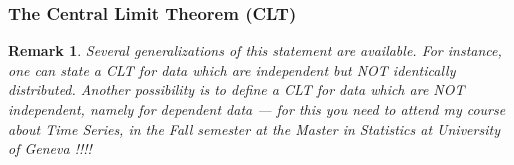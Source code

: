 \documentclass[notes=show,smaller,handout]{beamer}\usepackage[]{graphicx}\usepackage[]{color}
\newtheorem{remark}{Remark}[section]
\begin{document}
\begin{frame}%

\frametitle{The Central Limit Theorem (CLT)}

\begin{remark}
Several generalizations of this statement are available. For instance, one can state a CLT for data which are independent but NOT identically distributed. Another possibility is to define a CLT for data which are NOT independent, namely for dependent data --- for this you need to attend my course about Time Series, in the Fall semester at the Master in Statistics at University of Geneva !!!!
\end{remark}

\end{frame}%
\end{document}
